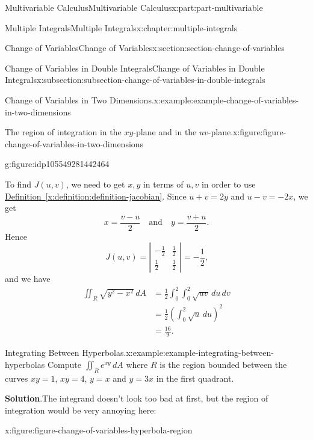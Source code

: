 \documentclass[twoside,10pt,]{book}
\newcommand{\blocktitlefont}{\relax}
\newcommand{\xreffont}{\relax}
\numberwithin{equation}{part}
\newcommand{\qq}[1]{\quad\text{#1}\quad}
\newcommand{\amp}{&}
\begin{document}
\begin{partptx}{Multivariable Calculus}{}{Multivariable Calculus}{}{}{x:part:part-multivariable}
\begin{chapterptx}{Multiple Integrals}{}{Multiple Integrals}{}{}{x:chapter:multiple-integrals}
\begin{sectionptx}{Change of Variables}{}{Change of Variables}{}{}{x:section:section-change-of-variables}
\begin{subsectionptx}{Change of Variables in Double Integrals}{}{Change of Variables in Double Integrals}{}{}{x:subsection:subsection-change-of-variables-in-double-integrals}
\begin{example}{Change of Variables in Two Dimensions.}{x:example:example-change-of-variables-in-two-dimensions}
\begin{figureptx}{The region of integration in the \(xy\)-plane and in the \(uv\)-plane.}{x:figure:figure-change-of-variables-in-two-dimensions}{}
\begin{sidebyside}{2}{0}{0}{0}
\begin{sbspanel}{0.5}
\begin{subfigureptx}{}{g:figure:idp105549281442464}{}
{
}%
\tcblower
\end{subfigureptx}%
\end{sbspanel}%
\end{sidebyside}%
\tcblower
\end{figureptx}%
To find \(J(u,v)\), we need to get \(x,y\) in terms of \(u,v\) in order to use \hyperref[x:definition:definition-jacobian]{Definition~{\xreffont\ref{x:definition:definition-jacobian}}}. Since \(u + v = 2y\) and \(u - v = -2x\), we get%
\begin{equation*}
x = \frac{v - u}{2} \qq{and} y = \frac{v + u}{2}\text{.}
\end{equation*}
Hence%
\begin{equation*}
J(u,v) = \left|\begin{array}{cc}-\frac{1}{2} \amp \frac{1}{2} \\ \frac{1}{2} \amp \frac{1}{2}\end{array}\right| = -\frac{1}{2}\text{,}
\end{equation*}
and we have%
\begin{align*}
\iint_{R}\sqrt{y^{2} - x^{2}}\,dA \amp = \frac{1}{2}\int_{0}^{2}\int_{0}^{2}\sqrt{uv}\,du\,dv \\
\amp = \frac{1}{2}\left(\int_{0}^{2}\sqrt{u}\,du\right)^{2} \\
\amp = \frac{16}{9} \text{.}
\end{align*}
%
\end{example}
\begin{example}{Integrating Between Hyperbolas.}{x:example:example-integrating-between-hyperbolas}%
Compute \(\iint_{R}e^{xy}\,dA\) where \(R\) is the region bounded between the curves \(xy = 1\), \(xy = 4\), \(y = x\) and \(y = 3x\) in the first quadrant.%
\par\smallskip%
\noindent\textbf{\blocktitlefont Solution}.\hypertarget{g:solution:idp105549281450912}{}\quad{}The integrand doesn't look too bad at first, but the region of integration would be very annoying here:%
\begin{figureptx}{}{x:figure:figure-change-of-variables-hyperbola-region}{}%

\end{figureptx}
\end{example}
\end{subsectionptx}
\end{sectionptx}
\end{chapterptx}
\end{partptx}
\end{document}
